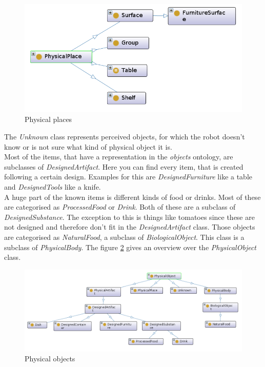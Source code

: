 \documentclass[main.tex]{subfiles}
\begin{document}
\begin{figure}[H]
\centering
\includegraphics[width=1.0\textwidth]{pictures/ontology/Ontologie_place}
\caption{Physical places}
\label{fig:place_ont}
\end{figure}

The \textit{Unknown} class represents perceived objects, for which the robot doesn't know or is not sure what kind of physical object it is.\\
Most of the items, that have a representation in the \textit{objects} ontology, are subclasses of \textit{DesignedArtifact}.
Here you can find every item, that is created following a certain design. 
Examples for this are \textit{DesignedFurniture} like a table and \textit{DesignedTools} like a knife.\\
A huge part of the known items is different kinds of food or drinks. Most of these are categorised as \textit{ProcessedFood} or \textit{Drink}. Both of these are a subclass of \textit{DesignedSubstance}. The exception to this is things like tomatoes since these are not designed and therefore don't fit in the \textit{DesignedArtifact} class. Those objects are categorised as \textit{NaturalFood}, a subclass of \textit{BiologicalObject}. This class is a subclass of \textit{PhysicalBody}. The figure \ref{fig:object_ont} gives an overview over the \textit{PhysicalObject} class.

\begin{rotatepage}
\begin{figure}[H]
\centering
\includegraphics[width=1.5\linewidth, angle=90]{pictures/ontology/Ontologie_objects}
\caption{Physical objects}
\label{fig:object_ont}
\end{figure}
\end{rotatepage}
\end{document}
